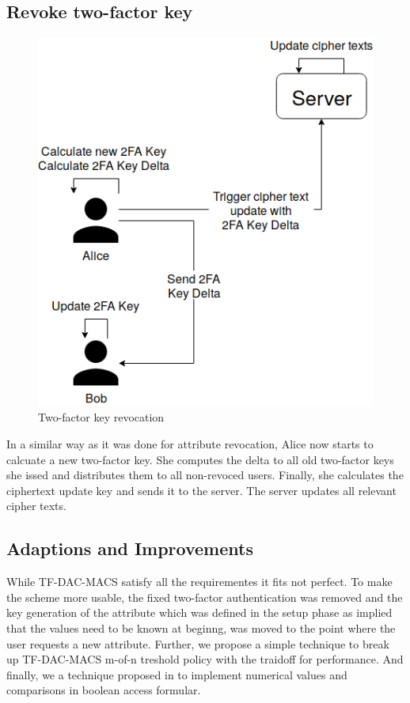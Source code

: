 \subsection{Revoke two-factor key}
\begin{figure}[!t]
\centering
    \includegraphics[width=0.6\linewidth]{img/TF-DAC-MACS-overview-revoce-user-key.png}
    \caption{Two-factor key revocation}
    \label{fig:tfdacmacs-user-auth-key-revocation}
\end{figure}

In a similar way as it was done for attribute revocation, Alice now starts to calcuate a new two-factor key. She computes the delta to all old two-factor keys she issed and distributes them to all non-revoced users. Finally, she calculates the ciphertext update key and sends it to the server. The server updates all relevant cipher texts.


\subsection{Adaptions and Improvements}
While TF-DAC-MACS satisfy all the requirementes it fits not perfect. To make the scheme more usable, the fixed two-factor authentication was removed and the key generation of the attribute which was defined in the setup phase as implied that the values need to be known at beginng, was moved to the point where the user requests a new attribute. Further, we propose a simple technique to break up TF-DAC-MACS m-of-n treshold policy with the traidoff for performance. And finally, we a technique proposed in \cite{bethencourt2007ciphertext} to implement numerical values and comparisons in boolean access formular. 

